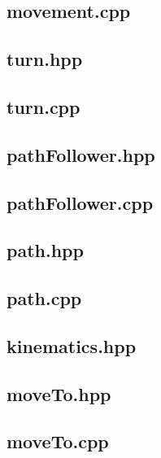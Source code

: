 \subsection{movement.cpp}

\subsection{turn.hpp}

\subsection{turn.cpp}

\subsection{pathFollower.hpp}

\subsection{pathFollower.cpp}

\subsection{path.hpp}

\subsection{path.cpp}

\subsection{kinematics.hpp}

\subsection{moveTo.hpp}

\subsection{moveTo.cpp}

